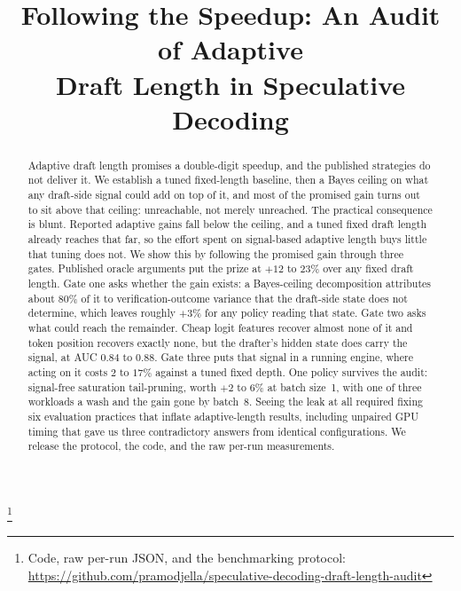 \documentclass[conference]{IEEEtran}
\newcommand\blfootnote[1]{%
  \begingroup
  \renewcommand\thefootnote{}\footnote{#1}%
  \addtocounter{footnote}{-1}%
  \endgroup
}
\begin{document}
\sloppy

\title{Following the Speedup: An Audit of Adaptive\\ Draft Length in Speculative Decoding}

\author{
}

\maketitle
\blfootnote{Code, raw per-run JSON, and the benchmarking protocol:
\url{https://github.com/pramodjella/speculative-decoding-draft-length-audit}}

\begin{abstract}
Adaptive draft length promises a double-digit speedup, and the published strategies do not
deliver it. We establish a tuned fixed-length baseline, then a Bayes ceiling on what any
draft-side signal could add on top of it, and most of the promised gain turns out to sit above
that ceiling: unreachable, not merely unreached. The practical consequence is blunt. Reported
adaptive gains fall below the ceiling, and a tuned fixed draft length already reaches that
far, so the effort spent on signal-based adaptive length buys little that tuning does not.
We show this by following the promised gain through three gates. Published oracle arguments
put the prize at $+12$ to $23\%$ over any fixed draft length. Gate one asks whether the gain exists: a Bayes-ceiling decomposition
attributes about $80\%$ of it to verification-outcome variance that the draft-side state does
not determine, which leaves roughly $+3\%$ for any policy reading that state. Gate two asks what could reach the remainder. Cheap logit
features recover almost none of it and token position recovers exactly none, but the drafter's
hidden state does carry the signal, at AUC $0.84$ to $0.88$. Gate three puts that signal in a
running engine, where acting on it costs $2$ to $17\%$ against a tuned fixed depth. One policy
survives the audit: signal-free saturation tail-pruning, worth $+2$ to $6\%$ at batch size~1,
with one of three workloads a wash and the gain gone by batch~8. Seeing the leak at all
required fixing six evaluation practices that inflate adaptive-length results, including
unpaired GPU timing that gave us three contradictory answers from identical configurations.
We release the protocol, the code, and the raw per-run measurements.
\end{abstract}
\end{document}
